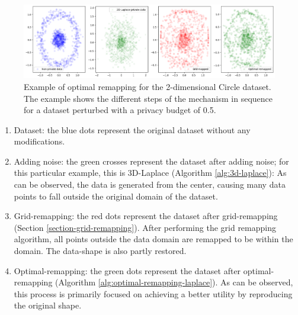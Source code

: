 \begin{figure}[H]
  \includegraphics[width=1.1\textwidth]{TheorethicalFramework//ND-Laplace//Images/output.png}
  \caption{Example of optimal remapping for the 2-dimensional Circle dataset. The example shows the different steps of the mechanism in sequence for a dataset perturbed with a privacy budget of 0.5.}
\end{figure}
\begin{enumerate}
  \item Dataset: the blue dots represent the original dataset without any modifications.
  \item Adding noise: the green crosses represent the dataset after adding noise; for this particular example, this is 3D-Laplace (Algorithm \ref{alg:3d-laplace}):
        As can be observed, the data is generated from the center, causing many data points to fall outside the original domain of the dataset.
  \item Grid-remapping: the red dots represent the dataset after grid-remapping (Section \ref{section-grid-remapping}).
        After performing the grid remapping algorithm, all points outside the data domain are remapped to be within the domain. The data-shape is also partly restored. 
  \item Optimal-remapping: the green dots represent the dataset after optimal-remapping (Algorithm \ref{alg:optimal-remapping-laplace}). As can be observed, this process is primarily focused on achieving a better utility by reproducing the original shape.
\end{enumerate}
